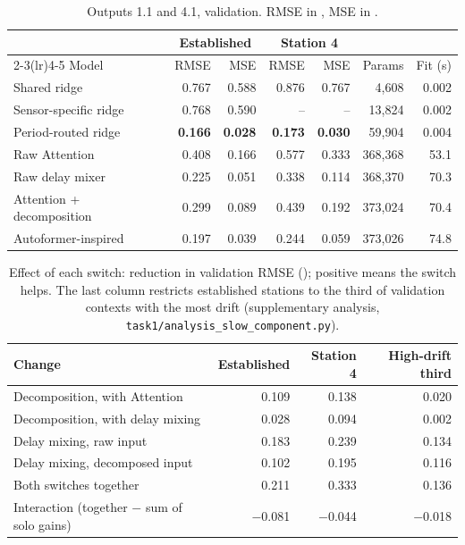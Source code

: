 \begin{table}[H]\centering\small
\caption{Outputs 1.1 and 4.1, validation. RMSE in \ms, MSE in \mss.}
\begin{tabular}{lrrrrrr}
\toprule
 & \multicolumn{2}{c}{Established} & \multicolumn{2}{c}{Station 4} & & \\
\cmidrule(lr){2-3}\cmidrule(lr){4-5}
Model & RMSE & MSE & RMSE & MSE & Params & Fit (s) \\
\midrule
Shared ridge & 0.767 & 0.588 & 0.876 & 0.767 & 4{,}608 & 0.002\\
Sensor-specific ridge & 0.768 & 0.590 & -- & -- & 13{,}824 & 0.002\\
Period-routed ridge & \textbf{0.166} & \textbf{0.028} & \textbf{0.173} & \textbf{0.030} & 59{,}904 & 0.004\\
Raw Attention & 0.408 & 0.166 & 0.577 & 0.333 & 368{,}368 & 53.1\\
Raw delay mixer & 0.225 & 0.051 & 0.338 & 0.114 & 368{,}370 & 70.3\\
Attention + decomposition & 0.299 & 0.089 & 0.439 & 0.192 & 373{,}024 & 70.4\\
Autoformer-inspired & 0.197 & 0.039 & 0.244 & 0.059 & 373{,}026 & 74.8\\
\bottomrule
\end{tabular}
\end{table}

\begin{table}[H]\centering\small
\caption{Effect of each switch: reduction in validation RMSE (\ms); positive means the switch helps. The last column restricts established stations to the third of validation contexts with the most drift (supplementary analysis, \texttt{task1/analysis\_slow\_component.py}).}
\begin{tabular}{lrrr}
\toprule
Change & Established & Station 4 & High-drift third\\
\midrule
Decomposition, with Attention & 0.109 & 0.138 & 0.020\\
Decomposition, with delay mixing & 0.028 & 0.094 & 0.002\\
Delay mixing, raw input & 0.183 & 0.239 & 0.134\\
Delay mixing, decomposed input & 0.102 & 0.195 & 0.116\\
Both switches together & 0.211 & 0.333 & 0.136\\
Interaction (together $-$ sum of solo gains) & $-$0.081 & $-$0.044 & $-$0.018\\
\bottomrule
\end{tabular}
\end{table}

